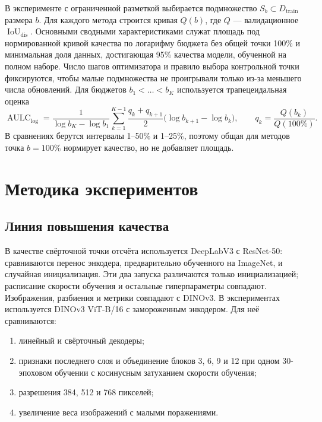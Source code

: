 \documentclass[a4paper,12pt]{extarticle}
\begin{document}
В эксперименте с ограниченной разметкой выбирается подмножество
$S_b\subset D_{\mathrm{train}}$ размера $b$. Для каждого метода строится кривая
$Q(b)$, где $Q$ --- валидационное $\operatorname{IoU}_{\mathrm{dis}}$. Основными
сводными характеристиками служат площадь под нормированной кривой качества по
логарифму бюджета без общей точки 100\% и
минимальная доля данных, достигающая 95\% качества модели, обученной на полном
наборе. Число шагов оптимизатора и правило выбора контрольной точки фиксируются, чтобы
малые подмножества не проигрывали только из-за меньшего числа обновлений.
Для бюджетов $b_1<\ldots<b_K$ используется трапецеидальная оценка
\begin{equation}
  \operatorname{AULC}_{\log}=
  \frac{1}{\log b_K-\log b_1}
  \sum_{k=1}^{K-1}
  \frac{q_k+q_{k+1}}{2}\bigl(\log b_{k+1}-\log b_k\bigr),
  \qquad q_k=\frac{Q(b_k)}{Q(100\%)}.
\end{equation}
В сравнениях берутся интервалы 1--50\% и 1--25\%, поэтому общая для методов
точка $b=100\%$ нормирует качество, но не добавляет площадь.

\section{Методика экспериментов}

\subsection{Линия повышения качества}

В качестве свёрточной точки отсчёта используется DeepLabV3 с ResNet-50:
сравниваются перенос энкодера, предварительно обученного на ImageNet, и
случайная инициализация. Эти два запуска различаются только инициализацией;
расписание скорости обучения и остальные гиперпараметры совпадают. Изображения,
разбиения и метрики совпадают с DINOv3.
В экспериментах используется DINOv3 ViT-B/16 с замороженным энкодером.
Для неё сравниваются:

\begin{enumerate}
  \item линейный и свёрточный декодеры;
  \item признаки последнего слоя и объединение блоков 3, 6, 9 и 12 при одном
  30-эпоховом обучении с косинусным затуханием скорости обучения;
  \item разрешения 384, 512 и 768 пикселей;
  \item увеличение веса изображений с малыми поражениями.
\end{enumerate}
\end{document}
